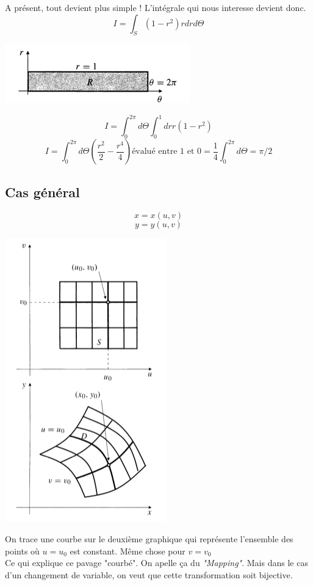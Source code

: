  A présent, tout devient plus simple ! L'intégrale qui nous interesse devient donc.
 \[I=\int_S (1-r^2)r dr d\Theta\]
\begin{center}
 \includegraphics[scale=0.7]{image7.png}
\end{center}
 \[I=\int_0^{2\pi} d\Theta \int_0^1 dr r (1-r^2)\]
 \[I = \int_0^{2\pi} d \Theta \left(\frac{r^2}{2}-\frac{r^4}{4} \right) \text{évalué entre 1 et 0} = \frac{1}{4} \int_0^{2\pi} d \Theta = \pi/2 \]

\subsection{Cas général}

$$x=x(u,v)$$
$$y=y(u,v)$$
\begin{center}
\includegraphics[scale=0.5]{image8.png}
\end{center}

On trace une courbe sur le deuxième graphique qui représente l'ensemble des points où $u=u_0$ est constant. Même chose pour $v=v_0$\\
Ce qui explique ce pavage "courbé". On apelle ça du \textit{"Mapping"}. Mais dans le cas d'un changement de variable, on veut que cette transformation soit bijective.\\

